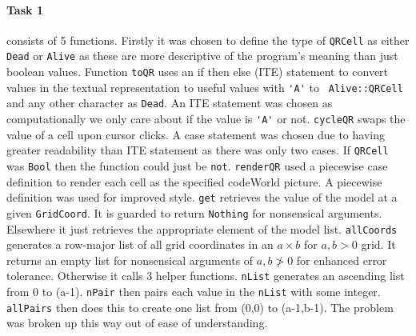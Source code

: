 \documentclass[11pt]{article}
\begin{document}
\paragraph{Task 1} consists of 5 functions. Firstly it was chosen to define the type of \verb|QRCell| as either \verb|Dead| or \verb|Alive| as these are more descriptive of the program's meaning than just boolean values. Function \verb|toQR| uses an if then else (ITE) statement to convert values in the textual representation to useful values with \verb|'A'| to \verb| Alive::QRCell| and any other character as \verb|Dead|. An ITE statement was chosen as computationally we only care about if the value is \verb|'A'| or not. \verb|cycleQR| swaps the value of a cell upon cursor clicks. A case statement was chosen due to having greater readability than ITE statement as there was only two cases. If \verb|QRCell| was \verb|Bool| then the function could just be \verb|not|. \verb|renderQR| used a piecewise case definition to render each cell as the specified codeWorld picture. A piecewise definition was used for improved style. \verb|get| retrieves the value of the model at a given \verb|GridCoord|. It is guarded to return \verb|Nothing| for nonsensical arguments. Elsewhere it just retrieves the appropriate element of the model list. \verb|allCoords| generates a row-major list of all grid coordinates in an $a\times b$ for $a,b>0$ grid. It returns an empty list for nonsensical arguments of $a,b\not>0$ for enhanced error tolerance. Otherwise it calls 3 helper functions. \verb|nList| generates an ascending list from 0 to (a-1). \verb|nPair| then pairs each value in the \verb|nList| with some integer. \verb|allPairs| then does this to create one list from (0,0) to (a-1,b-1). The problem was broken up this way out of ease of understanding.
\end{document}
